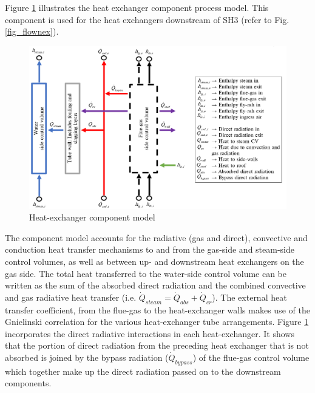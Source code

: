 \documentclass[11pt,cleanfoot]{asme2ej}
\begin{document}
Figure \ref{fig_heat_exchanger_model} illustrates the heat exchanger component process model. This component is used for the heat exchangers downstream of SH3 (refer to Fig. \ref{fig_flownex}).
\begin{figure}[h!]
\centerline{\includegraphics[scale=0.4]{HEAT_EXCHANGER_PROCESS_MODEL}}
\caption{Heat-exchanger component model}
\label{fig_heat_exchanger_model}
\end{figure}

The component model accounts for the radiative (gas and direct), convective and conduction heat transfer mechanisms to and from the gas-side and steam-side control volumes, as well as between up- and downstream heat exchangers on the gas side. The total heat transferred to the water-side control volume can be written as the sum of the absorbed direct radiation and the combined convective and gas radiative heat transfer (i.e. $\dot{Q}_{steam}=\dot{Q}_{abs}+\dot{Q}_{cr}$). The external heat transfer coefficient, from the flue-gas to the heat-exchanger walls makes use of the Gnielinski correlation \cite{Gnielinski2016} for the various heat-exchanger tube arrangements. Figure \ref{fig_heat_exchanger_model} incorporates the direct radiative interactions in each heat-exchanger. It shows that the portion of direct radiation from the preceding heat exchanger that is not absorbed is joined by the bypass radiation ($\dot{Q}_{bypass}$) of the flue-gas control volume which together make up  the direct radiation passed on to the downstream components.
\end{document}
